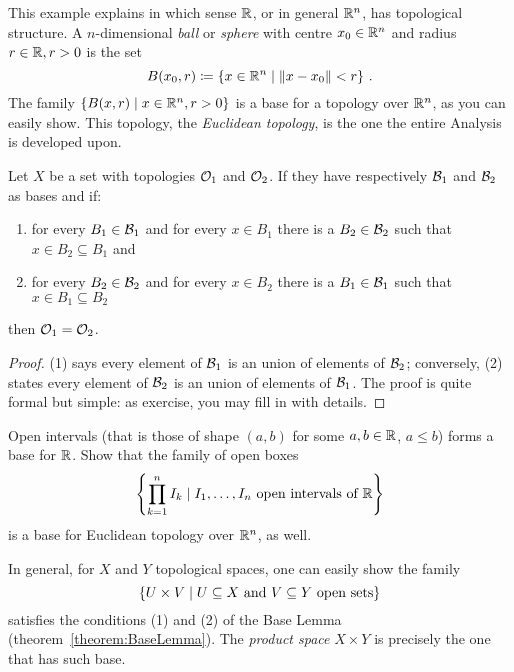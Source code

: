 \begin{example}
This example explains in which sense \(\mathbb R\), or in general \(\mathbb R^n\), has topological structure. A \(n\)-dimensional {\em ball} or {\em sphere} with centre \(x_0 \in \mathbb R^n\) and radius \(r \in \mathbb R, r>0\) is the set
\[B(x_0, r) \coloneq \left\{x \in \mathbb R^n \mid \lVert x-x_0\rVert < r\right\}\,.\]
The family \(\left\{B(x, r) \mid x \in \mathbb R^n, r>0\right\}\) is a base for a topology over \(\mathbb R^n\), as you can easily show. This topology, the {\em Euclidean topology}, is the one the entire Analysis is developed upon.
\end{example}

\begin{theorem}
Let \(X\) be a set with topologies \(\mathcal O_1\) and \(\mathcal O_2\). If they have respectively \(\mathcal B_1\) and \(\mathcal B_2\) as bases and if:
\begin{enumerate}
\item for every \(B_1 \in \mathcal B_1\) and for every \(x \in B_1\) there is a \(B_2 \in \mathcal B_2\) such that \(x \in B_2 \subseteq B_1\) and
\item for every \(B_2 \in \mathcal B_2\) and for every \(x \in B_2\) there is a \(B_1 \in \mathcal B_1\) such that \(x \in B_1 \subseteq B_2\)
\end{enumerate}
then \(\mathcal O_1 = \mathcal O_2\).
\end{theorem}

\begin{proof}
(1) says every element of \(\mathcal B_1\) is an union of elements of \(\mathcal B_2\); conversely, (2) states every element of \(\mathcal B_2\) is an union of elements of \(\mathcal B_1\). The proof is quite formal but simple: as exercise, you may fill in with details.
\end{proof}

\begin{exercise}
Open intervals (that is those of shape \((a, b)\) for some \(a, b \in \mathbb R\), \(a \le b\)) forms a base for \(\mathbb R\). Show that the family of open boxes
\[\left\{\prod_{k=1}^n I_k \mid I_1, \dots{}, I_n \text{ open intervals of } \mathbb R\right\}\]
is a base for Euclidean topology over \(\mathbb R^n\), as well.
\end{exercise}

\begin{construction}
In general, for \(X\) and \(Y\) topological spaces, one can easily show the family
\[\left\{U \times V\mid U \subseteq X \text{ and } V \subseteq Y \text{ open sets}\right\}\]
satisfies the conditions (1) and (2) of the Base Lemma (theorem~\ref{theorem:BaseLemma}). The {\em product space} \(X \times Y\) is precisely the one that has such base.
\end{construction}

